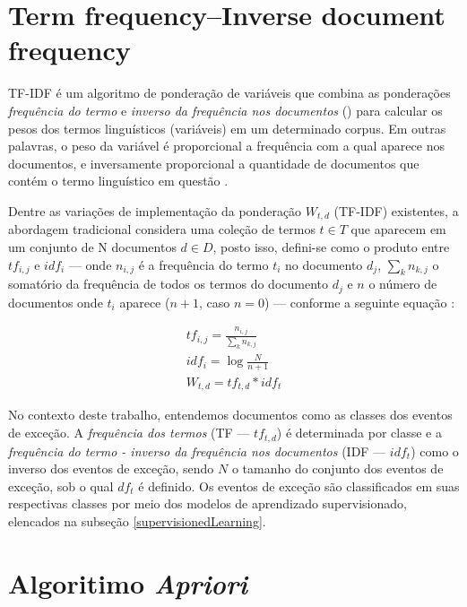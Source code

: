 \documentclass[
	12pt,				%
	oneside,			%
	a4paper,			%
	english,			%
	brazil				%
	]{abntex2ppgsi}
\begin{document}
\section{Term frequency–Inverse document frequency}

TF-IDF é um algoritmo de ponderação de variáveis que combina as ponderações \emph{frequência do termo}  e \emph{inverso da frequência nos documentos} () para calcular os pesos dos termos linguísticos (variáveis) em um determinado corpus. Em outras palavras, o peso da variável é proporcional a frequência com a qual aparece nos documentos, e inversamente proporcional a quantidade de documentos que contém o termo linguístico em questão \cite{wu2018improved, yahav2018comments}. 


Dentre as variações de implementação da ponderação $W_{t,d}$ (TF-IDF) existentes, a abordagem tradicional considera uma coleção de termos $t \in T$ que aparecem em um conjunto de N documentos $d \in D$, posto isso, defini-se como o produto entre $tf_{i,j}$ e $idf_i$ --- onde $n_{i,j}$ é a frequência do termo $t_i$ no documento $d_j$, $\sum_k n_{k,j}$ o somatório da frequência de todos os termos do documento $d_j$ e $n$ o número de documentos onde $t_i$ aparece ($n + 1$, caso $n = 0$) --- conforme a seguinte equação \cite{wu2018improved}:

\begin{equation}
\begin{split}
tf_{i,j} = \frac{n_{i,j}}{\sum_k n_{k,j}}
\\
idf_i = \log \frac{N}{n + 1}
\\
W_{t,d} = tf_{t,d} * idf_t
\end{split}
\end{equation}

No contexto deste trabalho, entendemos documentos como as classes dos eventos de exceção. A \emph{frequência dos termos} (TF --- $tf_{t,d}$) é determinada por classe e a \emph{frequência do termo - inverso da frequência nos documentos} (IDF --- $idf_t $) como o inverso dos eventos de exceção, sendo $N$ o tamanho do conjunto dos eventos de exceção, sob o qual $df_t$ é definido. Os eventos de exceção são classificados em suas respectivas classes por meio dos modelos de aprendizado supervisionado, elencados na subseção \ref{supervisionedLearning}. 

\section{ Algoritimo \textit{Apriori}}
\label{apriori}
\end{document}
